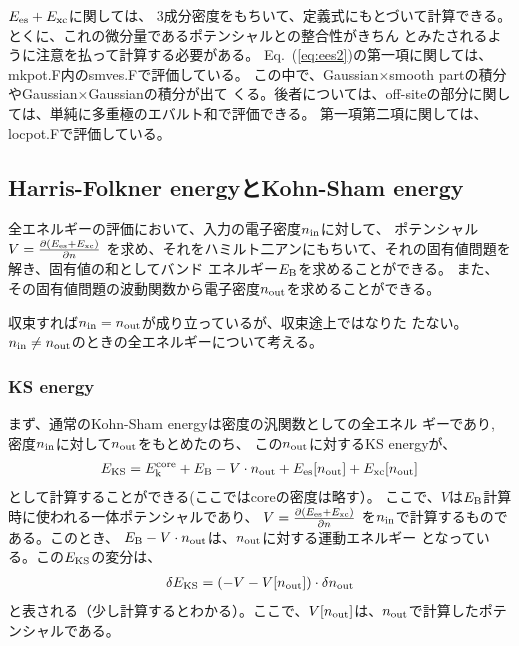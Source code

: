 \documentclass[a4paper,10pt,aip,onecolumn,amsmath,amssymb,floatfix,rmp]{revtex4-1}
\newcommand{\req}[1]{\mbox{Eq.~\!(\ref{#1})}}
\def\tn{\tilde{n}}
\begin{document}
$E_{\rm es} + E_{\rm xc}$に関しては、
3成分密度をもちいて、定義式にもとづいて計算できる。
とくに、これの微分量であるポテンシャルとの整合性がきちん
とみたされるように注意を払って計算する必要がある。
\req{eq:ees2}の第一項に関しては、mkpot.F内のsmves.Fで評価している。
この中で、Gaussian$\times$smooth partの積分やGaussian$\times$Gaussianの積分が出て
くる。後者については、off-siteの部分に関しては、単純に多重極のエバルト和で評価できる。
第一項第二項に関しては、locpot.Fで評価している。


\subsection{Harris-Folkner energyとKohn-Sham energy}
全エネルギーの評価において、入力の電子密度$n_{\rm in}$に対して、
ポテンシャル$V=\frac{\partial (E_{\rm es} + E_{\rm xc})}{\partial n}$
を求め、それをハミルト二アンにもちいて、それの固有値問題を解き、固有値の和としてバンド
エネルギー$E_{\rm B}$を求めることができる。
また、その固有値問題の波動関数から電子密度$n_{\rm out}$を求めることができる。

収束すれば$n_{\rm in}=n_{\rm out}$が成り立っているが、収束途上ではなりた
たない。$n_{\rm in}\ne n_{\rm out}$のときの全エネルギーについて考える。

\subsubsection{KS energy}
まず、通常のKohn-Sham energyは密度の汎関数としての全エネル
ギーであり, 密度$n_{\rm in}$に対して$n_{\rm out}$をもとめたのち、
この$n_{\rm out}$に対するKS energyが、
\begin{eqnarray}
E_{\rm KS} = E_{\rm k}^{\rm core} + E_{\rm B} - V \cdot n_{\rm out} + 
E_{\rm es}[n_{\rm out}] + E_{\rm xc}[n_{\rm out}]
\label{eq:etotks}
\end{eqnarray}
として計算することができる(ここではcoreの密度は略す）。
ここで、$V$は$E_{\rm B}$計算時に使われる一体ポテンシャルであり、
$V=\frac{\partial (E_{\rm es} + E_{\rm xc})}{\partial n}$
を$n_{\rm in}$で計算するものである。このとき、
$E_{\rm B} - V \cdot n_{\rm out}$は、$n_{\rm out}$に対する運動エネルギー
となっている。この$E_{\rm KS}$の変分は、
\begin{eqnarray}
\delta E_{\rm KS} = (-V-V[n_{\rm out}])\cdot \delta n_{\rm out}
\label{eq:detotks}
\end{eqnarray}
と表される（少し計算するとわかる）。ここで、$V[n_{\rm out}]$は、$n_{\rm
out}$で計算したポテンシャルである。\\
\end{document}
